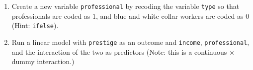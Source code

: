 \documentclass[12pt,letterpaper]{article}
\begin{document}
\vspace*{2cm}
\begin{enumerate}
	
	\item [(a)]
	Create a new variable \texttt{professional} by recoding the variable \texttt{type} so that professionals are coded as $1$, and blue and white collar workers are coded as $0$ (Hint: \texttt{ifelse}).
	
	
	\vspace{0.25cm}
	
	\newpage
	\item [(b)]
	Run a linear model with \texttt{prestige} as an outcome and \texttt{income}, \texttt{professional}, and the interaction of the two as predictors (Note: this is a continuous $\times$ dummy interaction.)
	
	
	

\end{enumerate}
\end{document}

